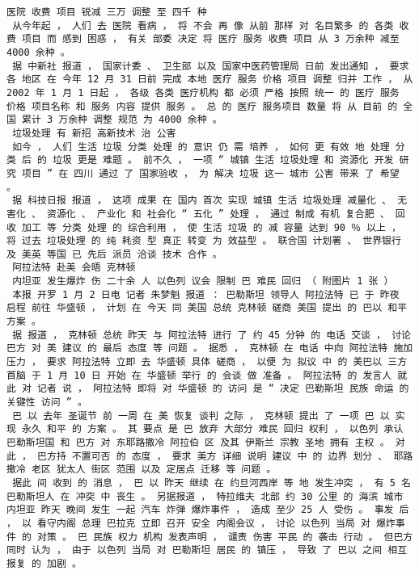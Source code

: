\documentclass{article}
\begin{document}
\begin{Verbatim}[commandchars=\\\{\}]
 医院 收费 项目 锐减 三万 调整 至 四千 种 
 从今年起 ， 人们 去 医院 看病 ， 将 不会 再 像 从前 那样 对 名目繁多 的 各类 收费 项目 而 感到 困惑 ， 有关 部委 决定 将 医疗 服务 收费 项目 从 3 万余种 减至 4000 余种 。 
 据 中新社 报道 ， 国家计委 、 卫生部 以及 国家中医药管理局 日前 发出通知 ， 要求 各 地区 在 今年 12 月 31 日前 完成 本地 医疗 服务 价格 项目 调整 归并 工作 ， 从 2002 年 1 月 1 日起 ， 各级 各类 医疗机构 都 必须 严格 按照 统一 的 医疗 服务 价格 项目名称 和 服务 内容 提供 服务 。 总 的 医疗 服务项目 数量 将 从 目前 的 全国 累计 3 万余种 调整 规范 为 4000 余种 。 
 垃圾处理 有 新招 高新技术 治 公害 
 如今 ， 人们 生活 垃圾 分类 处理 的 意识 仍 需 培养 ， 如何 更 有效 地 处理 分类 后 的 垃圾 更是 难题 。 前不久 ， 一项 “ 城镇 生活 垃圾处理 和 资源化 开发 研究 项目 ” 在 四川 通过 了 国家验收 ， 为 解决 垃圾 这一 城市 公害 带来 了 希望 。 
 据 科技日报 报道 ， 这项 成果 在 国内 首次 实现 城镇 生活 垃圾处理 减量化 、 无害化 、 资源化 、 产业化 和 社会化 “ 五化 ” 处理 ， 通过 制成 有机 复合肥 、 回收 加工 等 分类 处理 的 综合利用 ， 使 生活 垃圾 的 减 容量 达到 90 ％ 以上 ， 将 过去 垃圾处理 的 纯 耗资 型 真正 转变 为 效益型 。 联合国 计划署 、 世界银行 及 美英 等国 已 先后 派员 洽谈 技术 合作 。 
 阿拉法特 赴美 会晤 克林顿 
 内坦亚 发生爆炸 伤 二十余 人 以色列 议会 限制 巴 难民 回归 （ 附图片 1 张 ） 
 本报 开罗 1 月 2 日电 记者 朱梦魁 报道 ： 巴勒斯坦 领导人 阿拉法特 已 于 昨夜 启程 前往 华盛顿 ， 计划 在 今天 同 美国 总统 克林顿 磋商 美国 提出 的 巴以 和平 方案 。 
 据 报道 ， 克林顿 总统 昨天 与 阿拉法特 进行 了 约 45 分钟 的 电话 交谈 ， 讨论 巴方 对 美 建议 的 最后 态度 等 问题 。 据悉 ， 克林顿 在 电话 中向 阿拉法特 施加压力 ， 要求 阿拉法特 立即 去 华盛顿 具体 磋商 ， 以便 为 拟议 中 的 美巴以 三方 首脑 于 1 月 10 日 开始 在 华盛顿 举行 的 会谈 做 准备 。 阿拉法特 的 发言人 就此 对 记者 说 ， 阿拉法特 即将 对 华盛顿 的 访问 是 “ 决定 巴勒斯坦 民族 命运 的 关键性 访问 ” 。 
 巴 以 去年 圣诞节 前 一周 在 美 恢复 谈判 之际 ， 克林顿 提出 了 一项 巴 以 实现 永久 和平 的 方案 。 其 要点 是 巴 放弃 大部分 难民 回归 权利 ， 以色列 承认 巴勒斯坦国 和 巴方 对 东耶路撒冷 阿拉伯 区 及其 伊斯兰 宗教 圣地 拥有 主权 。 对此 ， 巴方持 不置可否 的 态度 ， 要求 美方 详细 说明 建议 中 的 边界 划分 、 耶路撒冷 老区 犹太人 街区 范围 以及 定居点 迁移 等 问题 。 
 据此 间 收到 的 消息 ， 巴 以 昨天 继续 在 约旦河西岸 等 地 发生冲突 ， 有 5 名 巴勒斯坦人 在 冲突 中 丧生 。 另据报道 ， 特拉维夫 北部 约 30 公里 的 海滨 城市 内坦亚 昨天 晚间 发生 一起 汽车 炸弹 爆炸事件 ， 造成 至少 25 人 受伤 。 事发 后 ， 以 看守内阁 总理 巴拉克 立即 召开 安全 内阁会议 ， 讨论 以色列 当局 对 爆炸事件 的 对策 。 巴 民族 权力 机构 发表声明 ， 谴责 伤害 平民 的 袭击 行动 。 但巴方 同时 认为 ， 由于 以色列 当局 对 巴勒斯坦 居民 的 镇压 ， 导致 了 巴以 之间 相互 报复 的 加剧 。 

\end{Verbatim}
\end{document}
